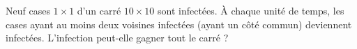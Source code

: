 Neuf cases $1 \times 1$ d'un carré $10 \times 10$ sont infectées. À chaque unité de temps, les cases ayant au moins deux voisines infectées (ayant un côté commun) deviennent infectées. L'infection peut-elle gagner tout le carré ?

